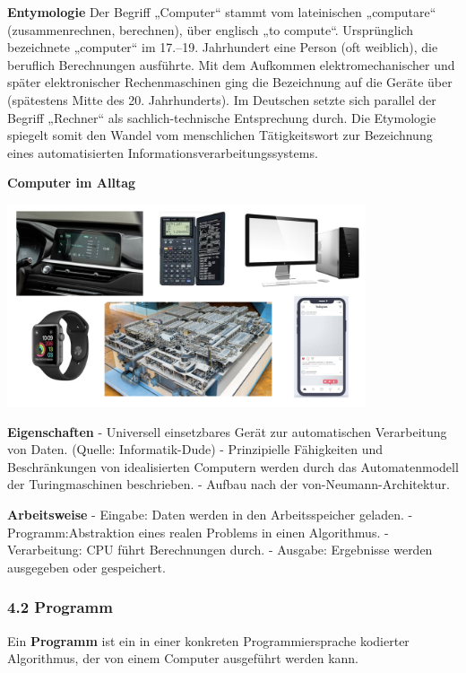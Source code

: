 \documentclass[
  11pt,
  a4paper,
  DIV=11,
  numbers=noendperiod]{scrartcl}
\begin{document}
\textbf{Entymologie} Der Begriff „Computer`` stammt vom lateinischen
„computare`` (zusammenrechnen, berechnen), über englisch „to compute``.
Ursprünglich bezeichnete „computer`` im 17.--19. Jahrhundert eine Person
(oft weiblich), die beruflich Berechnungen ausführte. Mit dem Aufkommen
elektromechanischer und später elektronischer Rechenmaschinen ging die
Bezeichnung auf die Geräte über (spätestens Mitte des 20. Jahrhunderts).
Im Deutschen setzte sich parallel der Begriff „Rechner`` als
sachlich-technische Entsprechung durch. Die Etymologie spiegelt somit
den Wandel vom menschlichen Tätigkeitswort zur Bezeichnung eines
automatisierten Informationsverarbeitungssystems.

\textbf{Computer im Alltag}

\includegraphics[width=4.16667in,height=\textheight,keepaspectratio]{images/computer.001.jpeg}

\textbf{Eigenschaften} - Universell einsetzbares Gerät zur automatischen
Verarbeitung von Daten. (Quelle: Informatik-Dude) - Prinzipielle
Fähigkeiten und Beschränkungen von idealisierten Computern werden durch
das Automatenmodell der Turingmaschinen beschrieben. - Aufbau nach der
von-Neumann-Architektur.

\textbf{Arbeitsweise} - Eingabe: Daten werden in den Arbeitsspeicher
geladen. - Programm:Abstraktion eines realen Problems in einen
Algorithmus. - Verarbeitung: CPU führt Berechnungen durch. - Ausgabe:
Ergebnisse werden ausgegeben oder gespeichert.

\subsubsection{4.2 Programm}\label{programm}

\begin{tcolorbox}[enhanced jigsaw, left=2mm, bottomtitle=1mm, breakable, toptitle=1mm, colbacktitle=quarto-callout-note-color!10!white, bottomrule=.15mm, colframe=quarto-callout-note-color-frame, toprule=.15mm, title=\textcolor{quarto-callout-note-color}{\faInfo}\hspace{0.5em}{Definition}, colback=white, titlerule=0mm, coltitle=black, opacityback=0, arc=.35mm, rightrule=.15mm, opacitybacktitle=0.6, leftrule=.75mm]

Ein \textbf{Programm} ist ein in einer konkreten Programmiersprache
kodierter Algorithmus, der von einem Computer ausgeführt werden kann.

\end{tcolorbox}
\end{document}
